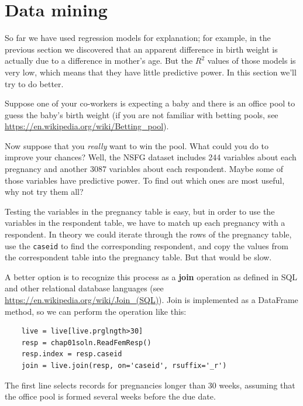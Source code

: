 \documentclass[12pt]{book}
\begin{document}
\section{Data mining}
\label{mining}

So far we have used regression models for explanation; for example,
in the previous section we discovered that an apparent difference
in birth weight is actually due to a difference in mother's age.
But the $R^2$ values of those models is very low, which means that
they have little predictive power.  In this section we'll try to
do better.

Suppose one of your co-workers is expecting a baby and
there is an office pool to guess the baby's birth weight (if you are
not familiar with betting pools, see
\url{https://en.wikipedia.org/wiki/Betting_pool}).

Now suppose that you {\em really} want to win the pool.  What could
you do to improve your chances?  Well, 
the NSFG dataset includes 244 variables about each pregnancy and another
3087 variables about each respondent.  Maybe some of those variables
have predictive power.  To find out which ones are most useful,
why not try them all?

Testing the variables in the pregnancy table is easy, but in order to
use the variables in the respondent table, we have to match up each
pregnancy with a respondent.  In theory we could iterate through the
rows of the pregnancy table, use the {\tt caseid} to find the
corresponding respondent, and copy the values from the
correspondent table into the pregnancy table.  But that would be slow.

A better option is to recognize this process as a {\bf join} operation
as defined in SQL and other relational database languages (see
\url{https://en.wikipedia.org/wiki/Join_(SQL)}).  Join is implemented
as a DataFrame method, so we can perform the operation like this:

\begin{verbatim}
    live = live[live.prglngth>30]
    resp = chap01soln.ReadFemResp()
    resp.index = resp.caseid
    join = live.join(resp, on='caseid', rsuffix='_r')
\end{verbatim}

The first line selects records for pregnancies longer than 30 weeks,
assuming that the office pool is formed several weeks before the
due date.
\end{document}
